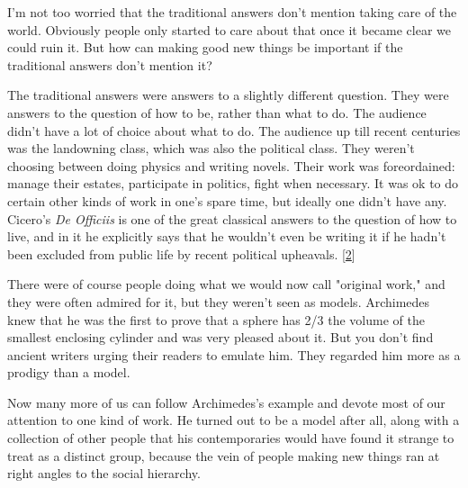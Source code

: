 I'm not too worried that the
                  traditional answers don't mention taking care of the world.
                  Obviously people only started to care about that once it
                  became clear we could ruin it. But how can making good new
                  things be important if the traditional answers don't mention
                  it?

The traditional answers were answers to a
                  slightly different question. They were answers to the question
                  of how to be, rather than what to do. The audience didn't have
                  a lot of choice about what to do. The audience up till recent
                  centuries was the landowning class, which was also the
                  political class. They weren't choosing between doing physics
                  and writing novels. Their work was foreordained: manage their
                  estates, participate in politics, fight when necessary. It was
                  ok to do certain other kinds of work in one's spare time, but
                  ideally one didn't have any. Cicero's \emph{De Officiis} is
                  one of the great classical answers to the question of how to
                  live, and in it he explicitly says that he wouldn't even be
                  writing it if he hadn't been excluded from public life by
                  recent political upheavals.
                  [\href{\#f2n}{2}]

There were of course people doing what we would
                  now call "original work," and they were often admired for it,
                  but they weren't seen as models. Archimedes knew that he was
                  the first to prove that a sphere has 2/3 the volume of the
                  smallest enclosing cylinder and was very pleased about it. But
                  you don't find ancient writers urging their readers to emulate
                  him. They regarded him more as a prodigy than a model.

Now
                  many more of us can follow Archimedes's example and devote
                  most of our attention to one kind of work. He turned out to be
                  a model after all, along with a collection of other people
                  that his contemporaries would have found it strange to treat
                  as a distinct group, because the vein of people making new
                  things ran at right angles to the social hierarchy.

